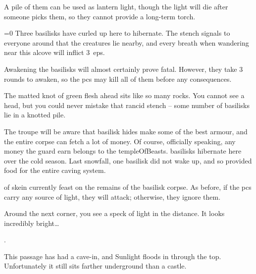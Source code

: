 \begin{multicols}{2}
A pile of them can be used as lantern light, though the light will die after  someone picks them, so they cannot provide a long-term torch.



\ifnum\value{temperature}=0
  Three \glspl{basilisk} have curled up here to hibernate.
  The stench signals to everyone around that the creatures lie nearby, and every breath when wandering near this alcove will inflict 3~\glspl{ep}.

  Awakening the \glspl{basilisk} will almost certainly prove fatal.
  However, they take 3 rounds to awaken, so the \glspl{pc} may kill all of them before any consequences.

  \begin{boxtext}
    The matted knot of green flesh ahead sits like so many rocks.
    You cannot see a head, but you could never mistake that rancid stench -- some number of \glspl{basilisk} lie in a knotted pile.
  \end{boxtext}


  The troupe will be aware that \gls{basilisk} hides make some of the best armour, and the entire corpse can fetch a lot of money.
  Of course, officially speaking, any money the \gls{guard} earn belongs to the \gls{templeOfBeasts}.%
\else
  \Glspl{basilisk} hibernate here over the cold season.
  Last snowfall, one \gls{basilisk} did not wake up, and so provided food for the entire caving system.

   of skein currently feast on the remains of the \gls{basilisk} corpse.
  As before, if the \glspl{pc} carry any source of light, they will attack; otherwise, they ignore them.

  \skeinSwarm

\fi

\begin{boxtext}
  Around the next corner, you see a speck of light in the distance.
  It looks incredibly bright\ldots
\end{boxtext}

.


This passage has had a cave-in, and Sunlight floods in through the top.
Unfortunately it still sits farther underground than a castle.


\end{multicols}
